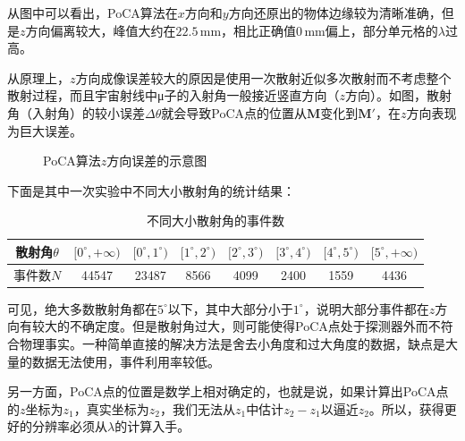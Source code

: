 \documentclass[fontset=none,zihao=-4]{ctexart}
\renewcommand\mathbf\bm
\begin{document}
从图中可以看出，PoCA算法在$x$方向和$y$方向还原出的物体边缘较为清晰准确，但是$z$方向偏离较大，峰值大约在$22.5\,\mathrm{mm}$，相比正确值$0\,\mathrm{mm}$偏上，部分单元格的$\lambda$过高。

从原理上，$z$方向成像误差较大的原因是使用一次散射近似多次散射而不考虑整个散射过程，而且宇宙射线中μ子的入射角一般接近竖直方向（$z$方向）。如图，散射角（入射角）的较小误差$\Delta\theta$就会导致PoCA点的位置从$\mathbf{M}$变化到$\mathbf{M}'$，在$z$方向表现为巨大误差。

\begin{figure}[ht]
    \centering
    \caption{\kaishu PoCA算法$z$方向误差的示意图}
\end{figure}

下面是其中一次实验中不同大小散射角的统计结果：

\begin{table}[ht]
    \centering
    \begin{tabular}{|c|c c c c c c c|}
        \hline
        散射角$\theta$ & $[0^\circ,+\infty)$ & $[0^\circ,1^\circ)$ & $[1^\circ,2^\circ)$ & $[2^\circ,3^\circ)$ & $[3^\circ,4^\circ)$ & $[4^\circ,5^\circ)$ & $[5^\circ,+\infty)$ \\
        \hline
        事件数$N$ & 44547 & 23487 & 8566 & 4099 & 2400 & 1559 & 4436 \\
        \hline
    \end{tabular}
    \caption{\kaishu 不同大小散射角的事件数}
\end{table}

可见，绝大多数散射角都在$5^\circ$以下，其中大部分小于$1^\circ$，说明大部分事件都在$z$方向有较大的不确定度。但是散射角过大，则可能使得PoCA点处于探测器外而不符合物理事实。一种简单直接的解决方法是舍去小角度和过大角度的数据，缺点是大量的数据无法使用，事件利用率较低。

另一方面，PoCA点的位置是数学上相对确定的，也就是说，如果计算出PoCA点的$z$坐标为$z_1$，真实坐标为$z_2$，我们无法从$z_1$中估计$z_2 - z_1$以逼近$z_2$。所以，获得更好的分辨率必须从$\lambda$的计算入手。
\end{document}
